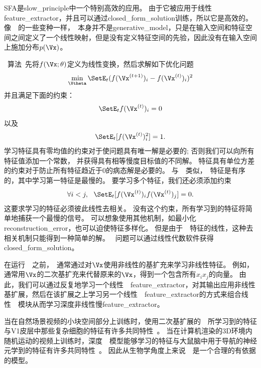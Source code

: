 \gls{SFA}是\gls{slow_principle}中一个特别高效的应用。
由于它被应用于线性\gls{feature_extractor}，并且可以通过\gls{closed_form_solution}训练，所以它是高效的。
像~~的一些变种一样，~本身并不是\gls{generative_model}，只是在输入空间和特征空间之间定义了一个线性映射，但是没有定义特征空间的先验，因此没有在输入空间上施加分布$p(\Vx)$。



~算法~\citep{WisSej2002}先将$f(\Vx;\theta)$定义为线性变换，然后求解如下优化问题
\begin{align}
	\label{eqn:138}
	\min_{\Vtheta} \SetE_t  (f(\Vx^{(t+1)})_i - f(\Vx^{(t)})_i  )^2
\end{align}
并且满足下面的约束：
\begin{align}
	\label{eqn:139}
	\SetE_t  f(\Vx^{(t)})_i = 0 
\end{align}
以及
\begin{align}
	\label{eqn:1310}
	\SetE_t [ f(\Vx^{(t)})_i^2 ] =1. 
\end{align} %
学习特征具有零均值的约束对于使问题具有唯一解是必要的; 
否则我们可以向所有特征值添加一个常数，
并获得具有相等慢度目标值的不同解。
特征具有单位方差的约束对于防止所有特征趋近于$0$的病态解是必要的。
与~~类似，~特征是有序的，其中学习第一特征是最慢的。
要学习多个特征，我们还必须添加约束
\begin{align}
\label{eqn:1311}
\forall i<j,\ \  \SetE_t [f(\Vx^{(t)})_i  f(\Vx^{(t)})_j] = 0.
\end{align}
这要求学习的特征必须彼此线性去相关。 
没有这个约束，所有学习到的特征将简单地捕获一个最慢的信号。
可以想象使用其他机制，如最小化\gls{reconstruction_error}，也可以迫使特征多样化。
但是由于~~特征的线性，这种去相关机制只能得到一种简单的解。 
~问题可以通过线性代数软件获得\gls{closed_form_solution}。



在运行~~之前，~通常通过对$\Vx$使用非线性的基扩充来学习非线性特征。
例如，通常用$\Vx$的二次基扩充来代替原来的$\Vx$，得到一个包含所有$x_ix_j$的向量。
由此，我们可以通过反复地学习一个线性~~\gls{feature_extractor}，对其输出应用非线性基扩展，然后在该扩展之上学习另一个线性~~\gls{feature_extractor}的方式来组合线性~~模块从而学习深度非线性慢\gls{feature_extractor}。



当在自然场景视频的小块空间部分上训练时，使用二次基扩展的~~所学习到的特征与V1皮层中那些复杂细胞的特征有许多共同特性~\citep{Berkes-Wiskott-2005}。
当在计算机渲染的3D环境内随机运动的视频上训练时，深度~~模型能够学习的特征与大鼠脑中用于导航的神经元学到的特征有许多共同特性~\citep{franzius2007slowness}。
因此从生物学角度上来说~~是一个合理的有依据的模型。



